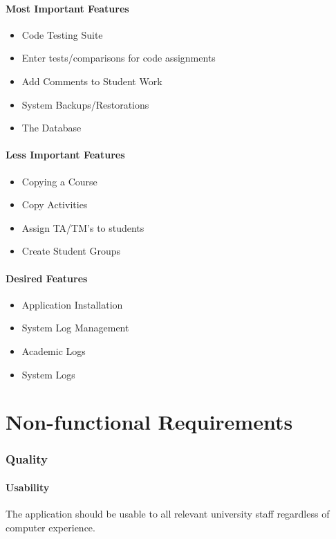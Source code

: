 \documentclass{article}
\begin{document}
\subsection{Most Important Features}
\begin{itemize}
  \item Code Testing Suite
  \item Enter tests/comparisons for code assignments
  \item Add Comments to Student Work
  \item System Backups/Restorations
  \item The Database
\end{itemize}

\subsection{Less Important Features}
\begin{itemize}
  \item Copying a Course
  \item Copy Activities
  \item Assign TA/TM's to students
  \item Create Student Groups
\end{itemize}

\subsection{Desired Features}
\begin{itemize}
  \item Application Installation
  \item System Log Management
  \item Academic Logs
  \item System Logs
\end{itemize}

\part{Non-functional Requirements}
\section{Quality}
\subsection{Usability}
The application should be usable to all relevant university staff
regardless of computer experience.
\end{document}
